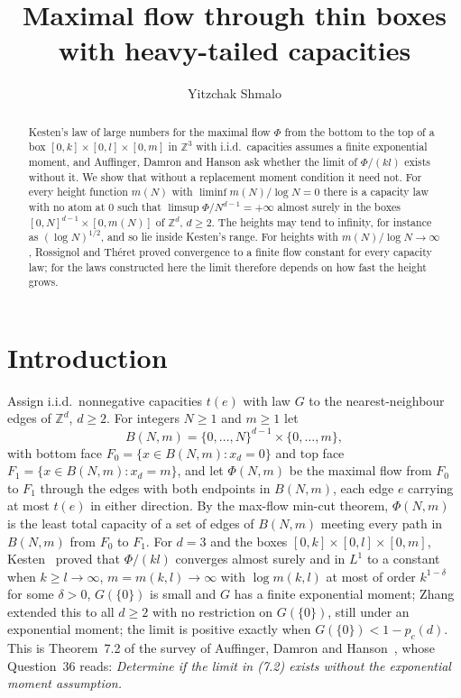 \documentclass[11pt]{amsart}
\title[Maximal flow through thin boxes]{Maximal flow through thin boxes with heavy-tailed capacities}
\author{Yitzchak Shmalo}
\theoremstyle{definition}
\theoremstyle{remark}
\newcommand{\Z}{\mathbb{Z}}
\begin{document}
\begin{abstract}
Kesten's law of large numbers for the maximal flow $\Phi$ from the bottom to the top of a box $[0,k]\times[0,l]\times[0,m]$ in $\Z^3$ with i.i.d.\ capacities assumes a finite exponential moment, and Auffinger, Damron and Hanson ask whether the limit of $\Phi/(kl)$ exists without it. We show that without a replacement moment condition it need not. For every height function $m(N)$ with $\liminf m(N)/\log N=0$ there is a capacity law with no atom at $0$ such that $\limsup\Phi/N^{d-1}=+\infty$ almost surely in the boxes $[0,N]^{d-1}\times[0,m(N)]$ of $\Z^d$, $d\ge2$. The heights may tend to infinity, for instance as $(\log N)^{1/2}$, and so lie inside Kesten's range. For heights with $m(N)/\log N\to\infty$, Rossignol and Th\'eret proved convergence to a finite flow constant for every capacity law; for the laws constructed here the limit therefore depends on how fast the height grows.
\end{abstract}

\maketitle

\section{Introduction}

Assign i.i.d.\ nonnegative capacities $t(e)$ with law $G$ to the nearest-neighbour edges of $\Z^d$, $d\ge2$. For integers $N\ge1$ and $m\ge1$ let
\[
B(N,m)=\{0,\dots,N\}^{d-1}\times\{0,\dots,m\},
\]
with bottom face $F_0=\{x\in B(N,m):x_d=0\}$ and top face $F_1=\{x\in B(N,m):x_d=m\}$, and let $\Phi(N,m)$ be the maximal flow from $F_0$ to $F_1$ through the edges with both endpoints in $B(N,m)$, each edge $e$ carrying at most $t(e)$ in either direction. By the max-flow min-cut theorem, $\Phi(N,m)$ is the least total capacity of a set of edges of $B(N,m)$ meeting every path in $B(N,m)$ from $F_0$ to $F_1$. For $d=3$ and the boxes $[0,k]\times[0,l]\times[0,m]$, Kesten~\cite{Ke} proved that $\Phi/(kl)$ converges almost surely and in $L^1$ to a constant when $k\ge l\to\infty$, $m=m(k,l)\to\infty$ with $\log m(k,l)$ at most of order $k^{1-\delta}$ for some $\delta>0$, $G(\{0\})$ is small and $G$ has a finite exponential moment; Zhang~\cite{Zh} extended this to all $d\ge2$ with no restriction on $G(\{0\})$, still under an exponential moment; the limit is positive exactly when $G(\{0\})<1-p_c(d)$. This is Theorem~7.2 of the survey of Auffinger, Damron and Hanson~\cite{ADH}, whose Question~36 reads: \emph{Determine if the limit in (7.2) exists without the exponential moment assumption.}
\end{document}
